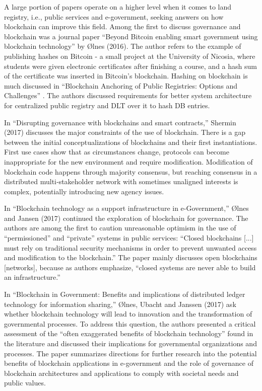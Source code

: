 \begin{multicols}{2}
A large portion of papers operate on a higher level when it comes to land registry, i.e., public services and e-government, seeking answers on how blockchain can improve this field. Among the first to discuss governance and blockchain was a journal paper “Beyond Bitcoin enabling smart government using blockchain technology” \cite{art1-key05} by Ølnes (2016). The author refers to the example of publishing hashes on Bitcoin - a small project at the University of Nicosia, where students were given electronic certificates after finishing a course, and a hash sum of the certificate was inserted in Bitcoin’s blockchain. Hashing on blockchain is much discussed in “Blockchain Anchoring of Public Registries: Options and Challenges” \cite{art1-key06}. The authors discussed  requirements for better system architecture for centralized public registry and DLT over it to hash DB entries.

In “Disrupting governance with blockchains and smart contracts,” \cite{art1-07} Shermin (2017) discusses the major constraints of the use of blockchain. There is a gap between the initial conceptualizations of blockchains and their first instantiations. First use cases show that as circumstances change, protocols can become inappropriate for the new environment and require modification. Modification of blockchain code happens through majority consensus, but reaching consensus in a distributed multi‐stakeholder network with sometimes unaligned interests is complex, potentially introducing new agency issues.

In “Blockchain technology as a support infrastructure in e-Government,” \cite{art1-08} Ølnes and Jansen (2017) continued the exploration of blockchain for governance. The authors are among the first to caution unreasonable optimism in the use of “permissioned” and “private” systems in public services: “Closed blockchains [...] must rely on traditional security mechanisms in order to prevent unwanted access and modification to the blockchain.” The paper mainly discusses open blockchains [networks], because as authors emphasize, “closed systems are never able to build an infrastructure.”

In “Blockchain in Government: Benefits and implications of distributed ledger technology for information sharing,” \cite{art1-key09} Ølnes, Ubacht and Janssen (2017) ask whether blockchain technology will lead to innovation and the transformation of governmental processes. To address this question, the authors presented a critical assessment of the “often exaggerated benefits of blockchain technology” found in the literature and discussed their implications for governmental organizations and processes. The paper summarizes directions for further research into the potential benefits of blockchain applications in e-government and the role of governance of blockchain architectures and applications to comply with societal needs and public values.


\end{multicols}
